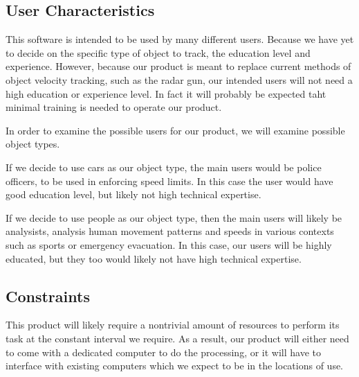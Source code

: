\documentclass[letterpaper,10pt,onecolumn,draftclsnofoot]{IEEEtran}
\begin{document}
\subsection{User Characteristics}



This software is intended to be used by many different users. 
Because we have yet to decide on the specific type of object to track, the education level and experience. 
However, because our product is meant to replace current methods of object velocity tracking, such as the radar gun, our intended users will not need a high education or experience level. 
In fact it will probably be expected taht minimal training is needed to operate our product.

In order to examine the possible users for our product, we will examine possible object types.

If we decide to use cars as our object type, the main users would be police officers, to be used in enforcing speed limits. 
In this case the user would have good education level, but likely not high technical expertise.

If we decide to use people as our object type, then the main users will likely be analysists, analysis human movement patterns and speeds in various contexts such as sports or emergency evacuation. In this case, our users will be highly educated, but they too would likely not have high technical expertise.

\subsection{Constraints}
This product will likely require a nontrivial amount of resources to perform its task at the constant interval we require.
As a result, our product will either need to come with a dedicated computer to do the processing, or it will have to interface with existing computers which we expect to be in the locations of use.
\end{document}
